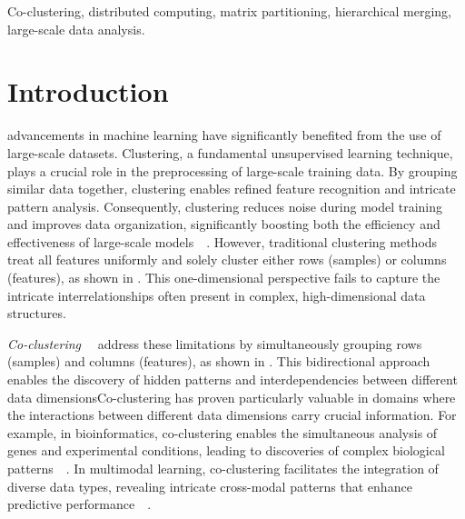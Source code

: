 \documentclass[journal]{IEEEtran}
\renewcommand{\cite}[1]{~\autocite{#1}}
\begin{document}
\begin{IEEEkeywords}
    Co-clustering, distributed computing, matrix partitioning, hierarchical merging, large-scale data analysis.
\end{IEEEkeywords}


\section{Introduction}
 advancements in machine learning have significantly benefited from the use of large-scale datasets. Clustering, a fundamental unsupervised learning technique, plays a crucial role in the preprocessing of large-scale training data. By grouping similar data together, clustering enables refined feature recognition and intricate pattern analysis. Consequently, clustering reduces noise during model training and improves data organization, significantly boosting both the efficiency and effectiveness of large-scale models~\cite{raskutti2002CombiningClusteringCotraining, li2014ClusteringguidedSparseStructural, ghimatgar2018ImprovedFeatureSelection}. However, traditional clustering methods~\cite{lloyd1982LeastSquaresQuantization, arthur2007KmeansAdvantagesCareful, mclachlan1987MixtureModelsInference} treat all features uniformly and solely cluster either rows (samples) or columns (features), as shown in . This one-dimensional perspective fails to capture the intricate interrelationships often present in complex, high-dimensional data structures.

\textit{Co-clustering}~\cite{kluger2003SpectralBiclusteringMicroarray, yan2017CoclusteringMultidimensionalBig,wu2024AccurateDetectionEllipses} address these limitations by simultaneously grouping rows (samples) and columns (features), as shown in . This bidirectional approach enables the discovery of hidden patterns and interdependencies between different data dimensionsCo-clustering has proven particularly valuable in domains where the interactions between different data dimensions carry crucial information. For example, in bioinformatics, co-clustering enables the simultaneous analysis of genes and experimental conditions, leading to discoveries of complex biological patterns~\cite{higham2007SpectralClusteringIts, kluger2003SpectralBiclusteringMicroarray, madeira2004BiclusteringAlgorithmsBiological, zhao2012BiclusteringAnalysisPattern, golchev2015BiclusteringAnalysisGene}.
In multimodal learning, co-clustering facilitates the integration of diverse data types, revealing intricate cross-modal patterns that enhance predictive performance~\cite{mu2022LearningHybridBehavior}.
\end{document}
